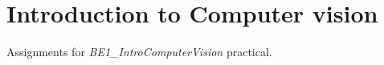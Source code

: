 \section{Introduction to Computer vision}
\label{sec:introduction_to_computer_vision}

Assignments for \textit{BE1\_IntroComputerVision} practical.